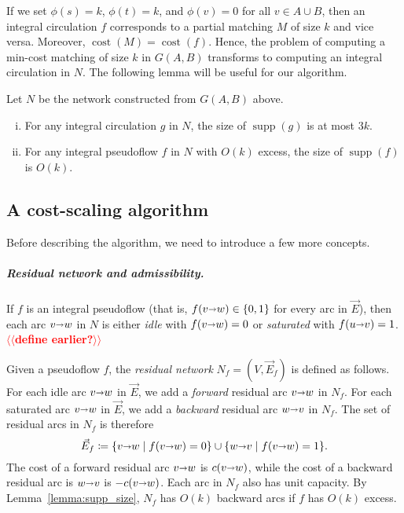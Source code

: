 \documentclass[a4paper,UKenglish]{socg-lipics-v2018}
\makeatletter
\def\fsupply{\phi}
\def\arcto{\mathord\shortrightarrow}
\def\arc#1#2{#1\arcto#2}
\def\cost{\operatorname{cost}}
\def\supp{\operatorname{supp}}
\theoremstyle{plain}
\numberwithin{figure}{section}
\renewcommand{\paragraph}{\subparagraph}
\def\EMPH#1{\textcolor{BrickRed}{{\emph{#1}}}}
\def\n@te#1{\textsf{\boldmath \textbf{$\langle\!\langle$#1$\rangle\!\rangle$}}\leavevmode}
\def\note#1{\textcolor{red}{\n@te{#1}}}
\makeatother
\begin{document}
If we set $\fsupply(s) = k$, $\fsupply(t) = k$, and $\fsupply(v) = 0$ for all
$v \in A \cup B$, then an integral circulation $f$ corresponds to a partial
matching $M$ of size $k$ and vice versa.
Moreover, $\cost(M) = \cost(f)$.
%
Hence, the problem of computing a min-cost matching of size $k$ in $G(A, B)$
transforms to computing an integral circulation in $N$.
The following lemma will be useful for our algorithm.

\begin{lemma}
\label{lemma:supp_size}
Let $N$ be the network constructed from $G(A, B)$ above.
\begin{enumerate}[(i)]
\item For any integral circulation $g$ in $N$, the size of $\supp(g)$ is at most $3k$.
\item For any integral pseudoflow $f$ in $N$ with $O(k)$ excess, the size of $\supp(f)$ is $O(k)$.
\end{enumerate}
\end{lemma}

\subsection{A cost-scaling algorithm}
\label{SS:cost-scale}

Before describing the algorithm, we need to introduce a few more concepts.

\paragraph{Residual network and admissibility.}
If $f$ is an integral pseudoflow
(that is, $f(\arc{v}{w}) \in \{0, 1\}$ for every arc in $\vec{E}$), then each arc
$\arc{v}{w}$ in $N$ is either \EMPH{idle} with $f(\arc{v}{w}) = 0$ or
\EMPH{saturated} with $f(\arc{u}{v}) = 1$. \note{define earlier?}

Given a pseudoflow $f$, the \EMPH{residual network} $N_f = (V, \vec{E}_f)$ is
defined as follows.
For each idle arc $\arc{v}{w}$ in $\vec{E}$, we add a \EMPH{forward} residual
arc $\arc{v}{w}$ in $N_f$.
For each saturated arc $\arc{v}{w}$ in $\vec{E}$, we add a \EMPH{backward}
residual arc $\arc{w}{v}$ in $N_f$.
The set of residual arcs in $N_f$ is therefore
\[
\vec{E}_f \coloneqq \{\arc{v}{w} \mid f(\arc{v}{w}) = 0\} \cup \{\arc{w}{v} \mid f(\arc{v}{w}) = 1\}.
\]
The cost of a forward residual arc $\arc{v}{w}$ is $c(\arc{v}{w})$,
while the cost of a backward residual arc is $\arc{w}{v}$ is $-c(\arc{v}{w})$.
Each arc in $N_f$ also has unit capacity.
By Lemma~\ref{lemma:supp_size}, $N_f$ has $O(k)$ backward arcs if $f$ has $O(k)$ excess.
\end{document}
